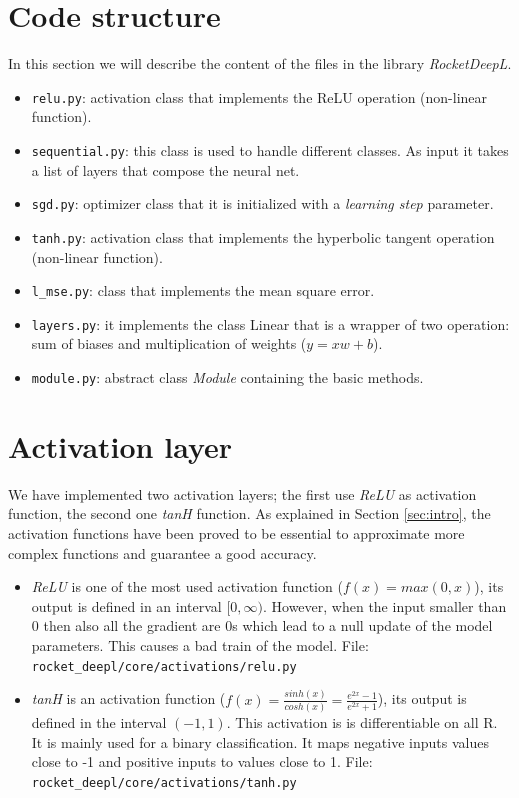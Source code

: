 \documentclass[journal, a4paper]{IEEEtran}
\begin{document}
\section{Code structure}
\label{sec:codestruc}
In this section we will describe the content of the files in the library \textit{RocketDeepL}.
\begin{itemize}
    \item \texttt{relu.py}: activation class that implements the ReLU operation (non-linear function).
    \item \texttt{sequential.py}: this class is used to handle different classes. As input it takes a list of layers that compose the neural net.
    \item \texttt{sgd.py}: optimizer class that it is initialized with a \textit{learning step} parameter.
    \item \texttt{tanh.py}: activation class that implements the hyperbolic tangent operation (non-linear function).
    \item \texttt{l\_mse.py}: class that implements the mean square error.
    \item \texttt{layers.py}: it implements the class Linear that is a wrapper of two operation: sum of biases and multiplication of weights ($y = xw + b$).
    \item \texttt{module.py}: abstract class \textit{Module} containing the basic methods.
\end{itemize}


\section{Activation layer}
\label{sec:activation}
We have implemented two activation layers; the first use \textit{ReLU} as activation function, the second one \textit{tanH} function. 
As explained in Section \ref{sec:intro}, the activation functions have been proved to be essential to approximate more complex functions and guarantee a good accuracy.
\begin{itemize}
    \item \textit{ReLU} is one of the most used activation function ($f(x) = max(0, x)$), its output is defined in an interval $[0, \infty )$. However, when the input smaller than 0 then also all the gradient are 0s which lead to a null update of the model parameters. This causes a bad train of the model. File: \texttt{rocket\_deepl/core/activations/relu.py}
    \item \textit{tanH} is an activation function ($f(x) = \frac{sinh(x)}{cosh(x)} = \frac{e^{2x} - 1}{e^{2x} + 1}$), its output is defined in the interval $(-1, 1)$. This activation is is differentiable on all R. It is mainly used for a binary classification. It maps negative inputs values close to -1 and positive inputs to values close to 1. File: \texttt{rocket\_deepl/core/activations/tanh.py}
\end{itemize}
\end{document}
